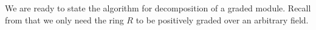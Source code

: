 \documentclass[12pt]{article}
\theoremstyle{theorem}
\numberwithin{thm}{section}
\theoremstyle{definition}
\begin{document}


We are ready to state the algorithm for decomposition of a graded module. Recall from  that we only need the ring $R$ to be positively graded over an arbitrary field.
\end{document}
